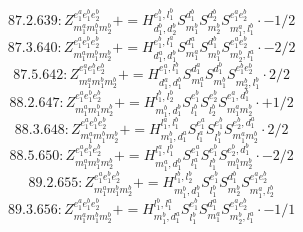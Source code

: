 \documentclass[letterpaper,10pt,fleqn,leqno,onecolumn]{article}
\begin{document}
\begin{equation} \;\;\;\;\;\;  87.2.639: Z^{e_{1}^{a}e_{1}^{b}e_{2}^{b}}_{m_{1}^{a}m_{1}^{b}m_{2}^{b}}+=H^{e_{1}^{b},l_{1}^{b}}_{d_{1}^{b},d_{2}^{b}}S^{d_{1}^{b}}_{m_{1}^{b}}S^{d_{2}^{b}}_{m_{2}^{b}}S^{e_{1}^{a}e_{2}^{b}}_{m_{1}^{a},l_{1}^{b}}\cdot -1/2 \end{equation}
\begin{equation} \;\;\;\;\;\;  87.3.640: Z^{e_{1}^{a}e_{1}^{b}e_{2}^{b}}_{m_{1}^{a}m_{1}^{b}m_{2}^{b}}+=H^{e_{1}^{b},l_{1}^{a}}_{d_{1}^{a},d_{1}^{b}}S^{d_{1}^{a}}_{m_{1}^{a}}S^{d_{1}^{b}}_{m_{1}^{b}}S^{e_{1}^{a}e_{2}^{b}}_{m_{2}^{b},l_{1}^{a}}\cdot -2/2 \end{equation}
\begin{equation} \;\;\;\;\;\;  87.5.642: Z^{e_{1}^{a}e_{1}^{b}e_{2}^{b}}_{m_{1}^{a}m_{1}^{b}m_{2}^{b}}+=H^{e_{1}^{a},l_{1}^{b}}_{d_{1}^{a},d_{1}^{b}}S^{d_{1}^{a}}_{m_{1}^{a}}S^{d_{1}^{b}}_{m_{1}^{b}}S^{e_{1}^{b}e_{2}^{b}}_{m_{2}^{b},l_{1}^{b}}\cdot 2/2 \end{equation}
\begin{equation} \;\;\;\;\;\;  88.2.647: Z^{e_{1}^{a}e_{1}^{b}e_{2}^{b}}_{m_{1}^{a}m_{1}^{b}m_{2}^{b}}+=H^{l_{1}^{b},l_{2}^{b}}_{m_{1}^{b},d_{1}^{b}}S^{e_{1}^{b}}_{l_{1}^{b}}S^{e_{2}^{b}}_{l_{2}^{b}}S^{e_{1}^{a},d_{1}^{b}}_{m_{1}^{a}m_{2}^{b}}\cdot +1/2 \end{equation}
\begin{equation} \;\;\;\;\;\;  88.3.648: Z^{e_{1}^{a}e_{1}^{b}e_{2}^{b}}_{m_{1}^{a}m_{1}^{b}m_{2}^{b}}+=H^{l_{1}^{a},l_{1}^{b}}_{m_{1}^{b},d_{1}^{a}}S^{e_{1}^{a}}_{l_{1}^{a}}S^{e_{1}^{b}}_{l_{1}^{b}}S^{e_{2}^{b},d_{1}^{a}}_{m_{1}^{a}m_{2}^{b}}\cdot 2/2 \end{equation}
\begin{equation} \;\;\;\;\;\;  88.5.650: Z^{e_{1}^{a}e_{1}^{b}e_{2}^{b}}_{m_{1}^{a}m_{1}^{b}m_{2}^{b}}+=H^{l_{1}^{a},l_{1}^{b}}_{m_{1}^{a},d_{1}^{b}}S^{e_{1}^{a}}_{l_{1}^{a}}S^{e_{1}^{b}}_{l_{1}^{b}}S^{e_{2}^{b},d_{1}^{b}}_{m_{1}^{b}m_{2}^{b}}\cdot -2/2 \end{equation}
\begin{equation} \;\;\;\;\;\;  89.2.655: Z^{e_{1}^{a}e_{1}^{b}e_{2}^{b}}_{m_{1}^{a}m_{1}^{b}m_{2}^{b}}+=H^{l_{1}^{b},l_{2}^{b}}_{m_{1}^{b},d_{1}^{b}}S^{e_{1}^{b}}_{l_{1}^{b}}S^{d_{1}^{b}}_{m_{2}^{b}}S^{e_{1}^{a}e_{2}^{b}}_{m_{1}^{a},l_{2}^{b}} \end{equation}
\begin{equation} \;\;\;\;\;\;  89.3.656: Z^{e_{1}^{a}e_{1}^{b}e_{2}^{b}}_{m_{1}^{a}m_{1}^{b}m_{2}^{b}}+=H^{l_{1}^{b},l_{1}^{a}}_{m_{1}^{b},d_{1}^{a}}S^{e_{1}^{b}}_{l_{1}^{b}}S^{d_{1}^{a}}_{m_{1}^{a}}S^{e_{1}^{a}e_{2}^{b}}_{m_{2}^{b},l_{1}^{a}}\cdot -1/1 \end{equation}
\end{document}
